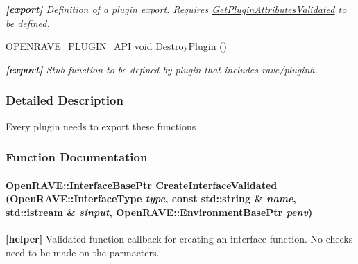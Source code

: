 \begin{DoxyCompactItemize}
\begin{DoxyCompactList}\small\item\em {\bfseries {\bfseries }\mbox{[}export\mbox{]}} Definition of a plugin export. Requires \hyperlink{group__plugin__exports_gaf90c03438b94cc76e7b8a54d445ec106}{GetPluginAttributesValidated} to be defined. \item\end{DoxyCompactList}\item 
\hypertarget{group__plugin__exports_gad6773d91dae37d0ba9de59d2a05277e4}{
OPENRAVE\_\-PLUGIN\_\-API void \hyperlink{group__plugin__exports_gad6773d91dae37d0ba9de59d2a05277e4}{DestroyPlugin} ()}
\label{group__plugin__exports_gad6773d91dae37d0ba9de59d2a05277e4}

\begin{DoxyCompactList}\small\item\em {\bfseries {\bfseries }\mbox{[}export\mbox{]}} Stub function to be defined by plugin that includes rave/pluginh. \item\end{DoxyCompactList}\end{DoxyCompactItemize}


\subsubsection{Detailed Description}
Every plugin needs to export these functions 

\subsubsection{Function Documentation}
\hypertarget{group__plugin__exports_ga468c900067e08689383b3f8da642141f}{
\paragraph[{CreateInterfaceValidated}]{\setlength{\rightskip}{0pt plus 5cm}OpenRAVE::InterfaceBasePtr CreateInterfaceValidated (OpenRAVE::InterfaceType {\em type}, \/  const std::string \& {\em name}, \/  std::istream \& {\em sinput}, \/  OpenRAVE::EnvironmentBasePtr {\em penv})}\hfill}
\label{group__plugin__exports_ga468c900067e08689383b3f8da642141f}


{\bfseries {\bfseries }\mbox{[}helper\mbox{]}} Validated function callback for creating an interface function. No checks need to be made on the parmaeters. 

